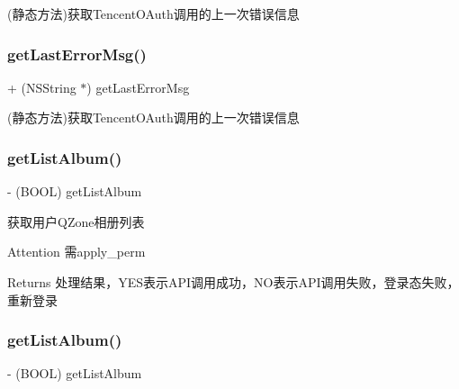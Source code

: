 (静态方法)获取\+Tencent\+O\+Auth调用的上一次错误信息 \mbox{\label{interface_tencent_o_auth_ada49d962f50bfadf8b3a7eb96420c684}} 
\subsubsection{\texorpdfstring{get\+Last\+Error\+Msg()}{getLastErrorMsg()}\hspace{0.1cm}{\footnotesize\ttfamily [2/2]}}
{\footnotesize\ttfamily + (N\+S\+String $\ast$) get\+Last\+Error\+Msg \begin{DoxyParamCaption}{ }\end{DoxyParamCaption}}

(静态方法)获取\+Tencent\+O\+Auth调用的上一次错误信息 \mbox{\label{interface_tencent_o_auth_a92728cf8bb95d933d06eca5b0109b200}} 
\subsubsection{\texorpdfstring{get\+List\+Album()}{getListAlbum()}\hspace{0.1cm}{\footnotesize\ttfamily [1/2]}}
{\footnotesize\ttfamily -\/ (B\+O\+OL) get\+List\+Album \begin{DoxyParamCaption}{ }\end{DoxyParamCaption}}

获取用户\+Q\+Zone相册列表 \begin{DoxyAttention}{Attention}
需apply\+\_\+perm 
\end{DoxyAttention}
\begin{DoxyReturn}{Returns}
处理结果，\+Y\+E\+S表示\+A\+P\+I调用成功，\+N\+O表示\+A\+P\+I调用失败，登录态失败，重新登录 
\end{DoxyReturn}
\mbox{\label{interface_tencent_o_auth_a92728cf8bb95d933d06eca5b0109b200}} 
\subsubsection{\texorpdfstring{get\+List\+Album()}{getListAlbum()}\hspace{0.1cm}{\footnotesize\ttfamily [2/2]}}
{\footnotesize\ttfamily -\/ (B\+O\+OL) get\+List\+Album \begin{DoxyParamCaption}{ }\end{DoxyParamCaption}}


